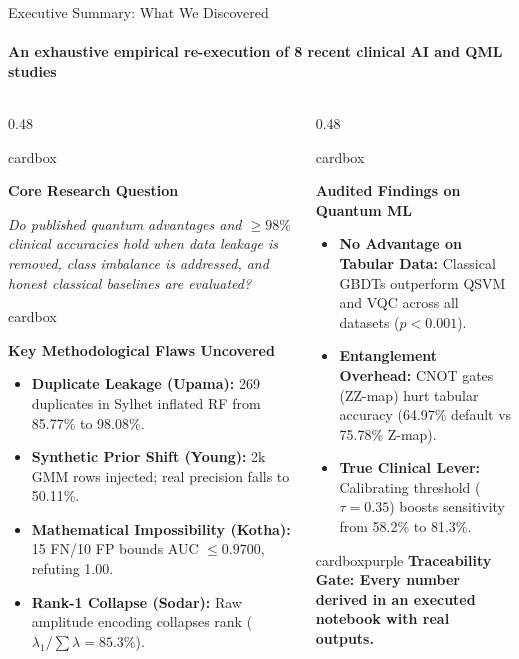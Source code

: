 \documentclass[aspectratio=169, 10pt]{beamer}
\newcommand{\cardbox}[3]{%
  \begin{beamercolorbox}[wd=\linewidth,rounded=true,sep=2.5pt]{cardbox}%
    {\bfseries\scriptsize\color{#1}#2\par}\vspace*{1pt}%
    {\footnotesize #3}%
  \end{beamercolorbox}%
}
\begin{document}
\begin{frame}{Executive Summary: What We Discovered}
  \framesubtitle{An exhaustive empirical re-execution of 8 recent clinical AI and QML studies}

  \begin{columns}[T]
    \begin{column}{0.48\textwidth}
      \cardbox{DeepPurple}{Core Research Question}{
        \textit{Do published quantum advantages and $\ge 98\%$ clinical accuracies hold when data leakage is removed, class imbalance is addressed, and honest classical baselines are evaluated?}
      }
      \vspace*{2pt}
      \cardbox{CoralRed}{Key Methodological Flaws Uncovered}{
        \begin{itemize}\setlength\itemsep{0.5pt}\scriptsize
          \item \textbf{Duplicate Leakage (Upama):} 269 duplicates in Sylhet inflated RF from 85.77\% to 98.08\%.
          \item \textbf{Synthetic Prior Shift (Young):} 2k GMM rows injected; real precision falls to 50.11\%.
          \item \textbf{Mathematical Impossibility (Kotha):} 15 FN/10 FP bounds AUC $\le 0.9700$, refuting 1.00.
          \item \textbf{Rank-1 Collapse (Sodar):} Raw amplitude encoding collapses rank ($\lambda_1/\sum\lambda = 85.3\%$).
        \end{itemize}
      }
    \end{column}

    \begin{column}{0.48\textwidth}
      \cardbox{TealAccent}{Audited Findings on Quantum ML}{
        \begin{itemize}\setlength\itemsep{1pt}\scriptsize
          \item \textbf{No Advantage on Tabular Data:} Classical GBDTs outperform QSVM and VQC across all datasets ($p < 0.001$).
          \item \textbf{Entanglement Overhead:} CNOT gates (ZZ-map) hurt tabular accuracy (64.97\% default vs 75.78\% Z-map).
          \item \textbf{True Clinical Lever:} Calibrating threshold ($\tau=0.35$) boosts sensitivity from 58.2\% to 81.3\%.
        \end{itemize}
      }
      \vspace*{2pt}
      \begin{beamercolorbox}[wd=\linewidth,rounded=true,center,sep=2pt]{cardboxpurple}
        {\tiny\bfseries\color{DeepPurple} Traceability Gate: Every number derived in an executed notebook with real outputs.}
      \end{beamercolorbox}
    \end{column}
  \end{columns}
\end{frame}
\end{document}
